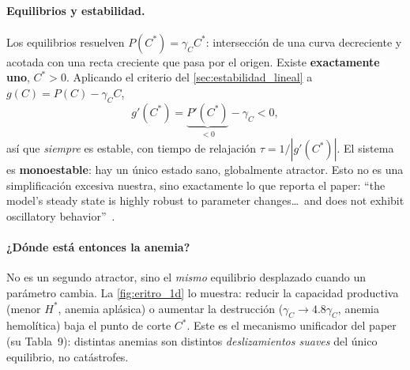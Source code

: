 \paragraph{Equilibrios y estabilidad.} Los equilibrios resuelven $P(C^*) = \gamma_C C^*$: intersección de una curva decreciente y acotada con una recta creciente que pasa por el origen. Existe \textbf{exactamente uno}, $C^*>0$. Aplicando el criterio del \cref{sec:estabilidad_lineal} a $g(C)=P(C)-\gamma_C C$,
\begin{equation}
    g'(C^*) = \underbrace{P'(C^*)}_{<0} - \gamma_C < 0,
\end{equation}
así que \emph{siempre} es estable, con tiempo de relajación $\tau = 1/|g'(C^*)|$. El sistema es \textbf{monoestable}: hay un único estado sano, globalmente atractor. Esto no es una simplificación excesiva nuestra, sino exactamente lo que reporta el paper: ``the model's steady state is highly robust to parameter changes\ldots\ and does not exhibit oscillatory behavior''~\cite{dor2026}.

\paragraph{¿Dónde está entonces la anemia?} No es un segundo atractor, sino el \emph{mismo} equilibrio desplazado cuando un parámetro cambia. La \cref{fig:eritro_1d} lo muestra: reducir la capacidad productiva (menor $H^*$, anemia aplásica) o aumentar la destrucción ($\gamma_C\to 4.8\gamma_C$, anemia hemolítica) baja el punto de corte $C^*$. Este es el mecanismo unificador del paper (su Tabla~9): distintas anemias son distintos \emph{deslizamientos suaves} del único equilibrio, no catástrofes.

